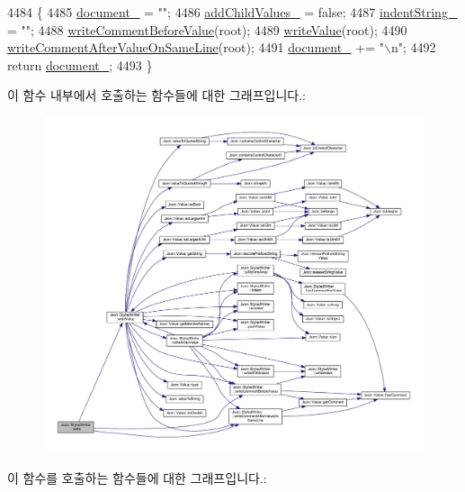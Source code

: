 \begin{DoxyCode}
4484                                                     \{
4485   \hyperlink{class_json_1_1_styled_writer_ae967b0c77e4d7cb889ce7b6ee4ce28d7}{document\_} = \textcolor{stringliteral}{""};
4486   \hyperlink{class_json_1_1_styled_writer_acaabfa48b50a8bb7fa9ce98e2ae971d9}{addChildValues\_} = \textcolor{keyword}{false};
4487   \hyperlink{class_json_1_1_styled_writer_a7d91709c94c152bd44eaf80faac130ae}{indentString\_} = \textcolor{stringliteral}{""};
4488   \hyperlink{class_json_1_1_styled_writer_ad3452c48fabf968bf3693549331ec06e}{writeCommentBeforeValue}(root);
4489   \hyperlink{class_json_1_1_styled_writer_ac40143cf43f7c4a94d3d0b41e5245069}{writeValue}(root);
4490   \hyperlink{class_json_1_1_styled_writer_ab12b274c62822fc51ec4617c6be95139}{writeCommentAfterValueOnSameLine}(root);
4491   \hyperlink{class_json_1_1_styled_writer_ae967b0c77e4d7cb889ce7b6ee4ce28d7}{document\_} += \textcolor{stringliteral}{"\(\backslash\)n"};
4492   \textcolor{keywordflow}{return} \hyperlink{class_json_1_1_styled_writer_ae967b0c77e4d7cb889ce7b6ee4ce28d7}{document\_};
4493 \}
\end{DoxyCode}
이 함수 내부에서 호출하는 함수들에 대한 그래프입니다.\+:
\nopagebreak
\begin{figure}[H]
\begin{center}
\leavevmode
\includegraphics[width=350pt]{class_json_1_1_styled_writer_a5efab19b9746da9920c29cdae3a6b404_cgraph}
\end{center}
\end{figure}
이 함수를 호출하는 함수들에 대한 그래프입니다.\+:\nopagebreak
